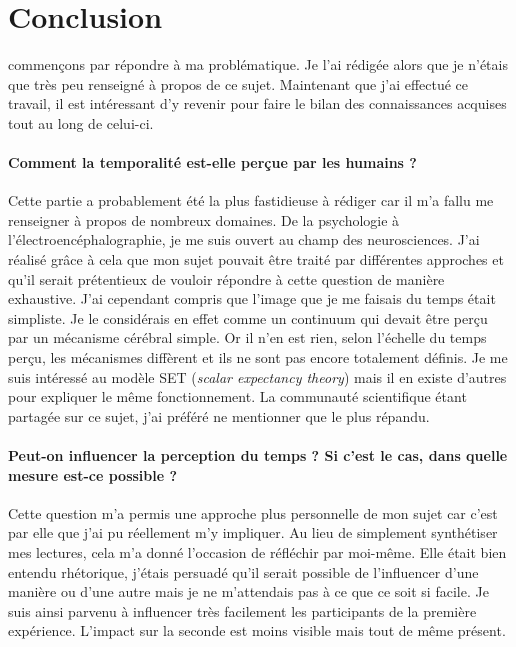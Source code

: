 \documentclass[12pt,fleqn,oneside,french,openany]{book} %
\begin{document}
\section{Conclusion} \label{sec:conclusion} commençons par répondre à ma problématique. Je l'ai rédigée alors que je n'étais que très peu renseigné à propos de ce sujet. Maintenant que j'ai effectué ce travail, il est intéressant d'y revenir pour faire le bilan des connaissances acquises tout au long de celui-ci.

\paragraph{Comment la temporalité est-elle perçue par les humains ?}
Cette partie a probablement été la plus fastidieuse à rédiger car il m'a fallu me renseigner à propos de nombreux domaines. De la psychologie à l'électroencéphalographie, je me suis ouvert au champ des neurosciences. J'ai réalisé grâce à cela que mon sujet pouvait être traité par différentes approches et qu'il serait prétentieux de vouloir répondre à cette question de manière exhaustive. J'ai cependant compris que l'image que je me faisais du temps était simpliste. Je le considérais en effet comme un continuum qui devait être perçu par un mécanisme cérébral simple. Or il n'en est rien, selon l'échelle du temps perçu, les mécanismes diffèrent et ils ne sont pas encore totalement définis. Je me suis intéressé au modèle SET (\emph{scalar expectancy theory}) mais il en existe d'autres pour expliquer le même fonctionnement. La communauté scientifique étant partagée sur ce sujet, j'ai préféré ne mentionner que le plus répandu.

\paragraph{Peut-on influencer la perception du temps ? Si c'est le cas, dans quelle mesure est-ce possible ?}
Cette question m'a permis une approche plus personnelle de mon sujet car c'est par elle que j'ai pu réellement m'y impliquer. Au lieu de simplement synthétiser mes lectures, cela m'a donné l'occasion de réfléchir par moi-même. Elle était bien entendu rhétorique, j'étais persuadé qu'il serait possible de l'influencer d'une manière ou d'une autre mais je ne m'attendais pas à ce que ce soit si facile. Je suis ainsi parvenu à influencer très facilement les participants de la première expérience. L'impact sur la seconde est moins visible mais tout de même présent.
\end{document}

